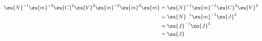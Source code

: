 \begin{align*}
        \zu{N}^{-1}\zu{m}^{-2}\zu{C}^2\zu{V}^2\zu{m}^{-2}\zu{m}^{2}\zu{m}
                        &= \zu{N}^{-1}\zu{m}^{-1}\zu{C}^2\zu{V}^2\\
                        &= \zu{N}^{-1}\zu{m}^{-1}\zu{J}^2\\
                        &= \zu{J}^{-1}\zu{J}^2\\
                        &= \zu{J}\\
\end{align*}
